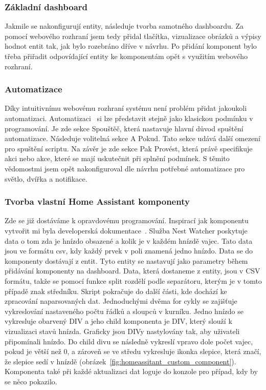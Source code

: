 \subsubsection*{Základní dashboard}
Jakmile se nakonfigurují entity, následuje tvorba samotného dashboardu.
Za pomocí webového rozhraní jsem tedy přidal tlačítka, vizualizace obrázků a výpisy hodnot entit tak, jak bylo rozebráno dříve v návrhu.
Po přidání komponent bylo třeba přiřadit odpovídající entity ke komponentám opět s využitím webového rozhraní.

\subsubsection*{Automatizace}
Díky intuitivnímu webovému rozhraní systému není problém přidat jakoukoli automatizaci.
Automatizaci~\cite{HomeAssistantAutomations} si lze představit stejně jako klasickou podmínku v programování.
Je zde sekce Spouštěč, která nastavuje hlavní důvod spuštění automatizace.
Následuje volitelná sekce A Pokud.
Tato sekce udává další omezení pro spuštění scriptu.
Na závěr je zde sekce Pak Provést, která právě specifikuje akci nebo akce, které se mají uskutečnit při splnění podmínek.
S těmito vědomostmi jsem opět nakonfiguroval dle návrhu potřebné automatizace pro světlo, dvířka a notifikace.

\subsubsection*{Tvorba vlastní Home Assistant komponenty}
Zde se již dostáváme k opravdovému programování.
Inspirací jak komponentu vytvořit mi byla developerská dokumentace~\cite{homeassistant-developers,HomeAssistantCustomCards}.
Služba Nest Watcher poskytuje data o tom zda je hnízdo obsazené a kolik je v každém hnízdě vajec.
Tato data jsou ve formátu \gls{csv}, kdy každý prvek v poli znamená jedno hnízdo.
Data se do komponenty dostávají z entit.
Tyto entity se nastavují jako parametry během přidávání komponenty na dashboard.
Data, která dostaneme z entity, jsou v CSV formátu, takže se pomocí funkce split rozdělí podle separátoru, kterým je v tomto případě znak středníku.
Skript pokračuje do další části, kde dochází ke zpracování naparsovaných dat.
Jednoduchými dvěma for cykly se zajišťuje vykreslování nastaveného počtu řádků a sloupců v kurníku.
Jedno hnízdo se vykresluje obarvený DIV a jeho child komponenta je DIV, který slouží k vizualizaci stavů hnízda.
Graficky jsou DIVy nastylovány tak, aby uživateli připomínali hnízdo.
Do child divu se následně vykreslí vpravo dole počet vajec, pokud je větší než 0, a zároveň se ve středu vykresluje ikonka slepice, která značí, že slepice sedí v hnízdě (obrázek~\ref{fig:homeassitant_custom_component}).
Komponenta také při každé aktualizaci dat loguje do konzole pro případ, kdy by se něco pokazilo.

